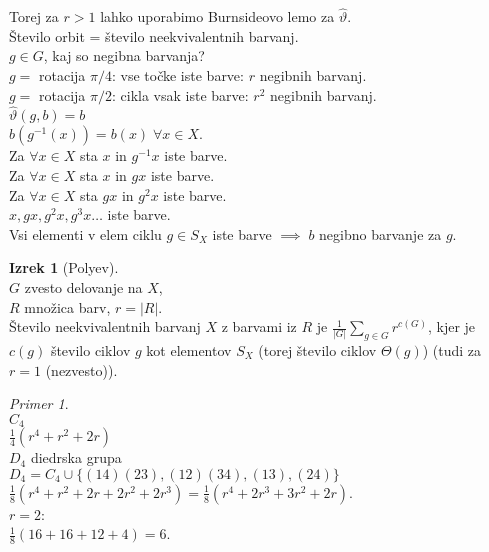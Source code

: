 \documentclass[a4paper, 12pt]{book}
\theoremstyle{definition}
\newtheorem{theorem}[counter]{Izrek}
\theoremstyle{remark}
\newtheorem*{ex}{Primer}
\begin{document}
Torej za $r > 1$ lahko uporabimo Burnsideovo lemo za $\widehat{\vartheta}$. \\
Število orbit = število neekvivalentnih barvanj. \\
$g \in G$, kaj so negibna barvanja? \\
$g =$ rotacija $\pi/4$: vse točke iste barve: $r$ negibnih barvanj. \\
$g =$ rotacija $\pi/2$: cikla vsak iste barve: $r^2$ negibnih barvanj. \\
$\widehat{\vartheta}(g, b) = b$ \\
$b(g^{-1}(x)) = b(x) \; \forall x \in X$. \\
Za $\forall x \in X$ sta $x$ in $g^{-1} x$ iste barve. \\
Za $\forall x \in X$ sta $x$ in $g x$ iste barve. \\
Za $\forall x \in X$ sta $g x$ in $g^{2} x$ iste barve. \\
$x, g x, g^2 x, g^3 x \dots$ iste barve. \\
Vsi elementi v elem ciklu $g \in S_X$ iste barve $\implies \; b$ negibno barvanje za $g$.
\begin{theorem}[Polyev] \text{} \\
  $G$ zvesto delovanje na $X$, \\
  $R$ množica barv, $r = |R|$. \\
  Število neekvivalentnih barvanj $X$ z barvami iz $R$ je $\frac{1}{|G|} \sum_{g \in G} r^{c(G)}$,
  kjer je $c(g)$ število ciklov $g$ kot elementov $S_X$ (torej število ciklov $\Theta(g)$)
  (tudi za $r=1$ (nezvesto)).
\end{theorem}
\begin{ex} \text{} \\
  $C_4$ \\
  $\frac{1}{4} \left(r^4 + r^2 + 2r\right)$ \\
  $D_4$ diedrska grupa \\
  $D_4 = C_4 \cup \{(1 4) (2 3), (1 2) (3 4), (1 3), (2 4)\}$ \\
  $\frac{1}{8} \left(r^4 + r^2 + 2r + 2r^2 + 2r^3\right) = \frac{1}{8} \left(r^4 + 2r^3 + 3r^2 + 2r\right)$. \\
  $r = 2$: \\
  $\frac{1}{8} (16 + 16 + 12 + 4) = 6$.
\end{ex}


\end{document}
